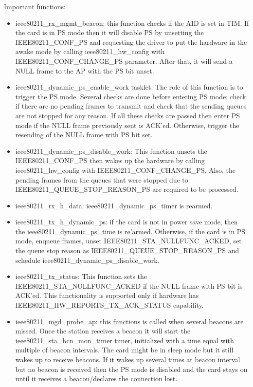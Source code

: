 \newpage
Important functions:
\begin{itemize}
\item ieee80211_rx_mgmt_beacon: this function checks if the AID is set in TIM. If the card is in PS mode then it will disable PS by unsetting the IEEE80211_CONF_PS and requesting the driver to put the hardware in the awake mode by calling ieee80211_hw_config with IEEE80211_CONF_CHANGE_PS parameter. After that, it will send a NULL frame to the AP with the PS bit unset.
\item ieee80211_dynamic_ps_enable_work tasklet: The role of this function is to trigger the PS mode. Several checks are done before entering PS mode: check if there are no pending frames to transmit and check that the sending queues are not stopped for any reason. If all these checks are passed then enter PS mode if the NULL frame previously sent is ACK'ed. Otherwise, trigger the resending of the NULL frame with PS bit set.
\item ieee80211_dynamic_ps_disable_work: This function unsets the IEEE80211_CONF_PS then wakes up the hardware by calling ieee80211_hw_config with IEEE80211_CONF_CHANGE_PS. Also, the pending frames from the queues that were stopped due to IEEE80211_QUEUE_STOP_REASON_PS are required to be processed.
\item ieee80211_rx_h_data: ieee80211_dynamic_ps_timer is rearmed.
\item ieee80211_tx_h_dynamic_ps: if the card is not in power save mode, then the ieee80211_dynamic_ps_time is re'armed. Otherwise, if the card is in PS mode, enqueue frames, unset IEEE80211_STA_NULLFUNC_ACKED, set the queue stop reason as IEEE80211_QUEUE_STOP_REASON_PS and schedule ieee80211_dynamic_ps_disable_work.
\item ieee80211_tx_status: This function sets the IEEE80211_STA_NULLFUNC_ACKED if the NULL frame with PS bit is ACK'ed. This functionality is supported only if hardware has IEEE80211_HW_REPORTS_TX_ACK_STATUS capability.
\item ieee80211_mgd_probe_ap: this functions is called when several beacons are missed. Once the station receives a beacon it will start the ieee80211_sta_bcn_mon_timer timer, initialized with a time equal with multiple of beacon intervals. The card might be in sleep mode but it still wakes up to receive beacons. If it wakes up several times at beacon interval but no beacon is received then the PS mode is disabled and the card stays on until it receives a beacon/declares the connection lost.
\end{itemize}

